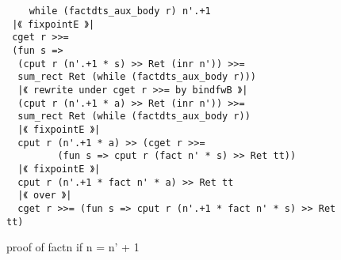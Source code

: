 \documentclass[japanese]{jssst_ppl}
\theoremstyle{definition}
\begin{document}
\begin{figure}
  \centering
  \begin{verbatim}
    while (factdts_aux_body r) n'.+1
 |《 fixpointE 》|
 cget r >>=
 (fun s =>
  (cput r (n'.+1 * s) >> Ret (inr n')) >>=
  sum_rect Ret (while (factdts_aux_body r)))
  |《 rewrite under cget r >>= by bindfwB 》|
  (cput r (n'.+1 * a) >> Ret (inr n')) >>=
  sum_rect Ret (while (factdts_aux_body r))
  |《 fixpointE 》|
  cput r (n'.+1 * a) >> (cget r >>=
         (fun s => cput r (fact n' * s) >> Ret tt))
  |《 fixpointE 》|
  cput r (n'.+1 * fact n' * a) >> Ret tt
  |《 over 》|
  cget r >>= (fun s => cput r (n'.+1 * fact n' * s) >> Ret tt)

       \end{verbatim}

  \iffalse
    \begin{verbatim}
    while (factdts_aux_body r) n'.+1
 |《 fixpointE 》|
 cget r >>=
 (fun s : coq_type N ml_int =>
  (cput r (n'.+1 * s) >> Ret (inr n')) >>=
  sum_rect Ret (while (factdts_aux_body r)))
  |《 rewrite under cget r >>= by bindfwB 》|
  (cput r (n'.+1 * a) >> Ret (inr n')) >>=
  sum_rect Ret (while (factdts_aux_body r))
  |《 fixpointE 》|
  cput r (n'.+1 * a) >> (cget r >>=
         (fun s : coq_type N ml_int => cput r (fact n' * s) >> Ret tt))
  |《 fixpointE 》|
  cput r (n'.+1 * fact n' * a) >> Ret tt
  |《 over 》|
  cget r >>= (fun s : coq_type N ml_int => cput r (n'.+1 * fact n' * s) >> Ret tt)

       \end{verbatim}
  \fi
  \caption{proof of factn if n =  n' + 1 }
\end{figure}
\end{document}
